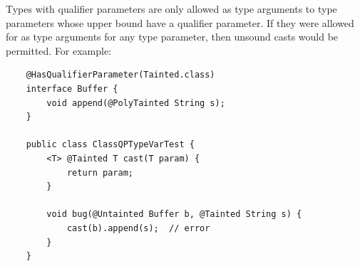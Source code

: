 %
%
%


Types with qualifier parameters are only allowed as type arguments to type parameters whose upper bound
have a qualifier parameter. If they were allowed for as type arguments for any type parameter, then
unsound casts would be permitted. For example:

\begin{Verbatim}
    @HasQualifierParameter(Tainted.class)
    interface Buffer {
        void append(@PolyTainted String s);
    }

    public class ClassQPTypeVarTest {
        <T> @Tainted T cast(T param) {
            return param;
        }

        void bug(@Untainted Buffer b, @Tainted String s) {
            cast(b).append(s);  // error
        }
    }


\end{Verbatim}

